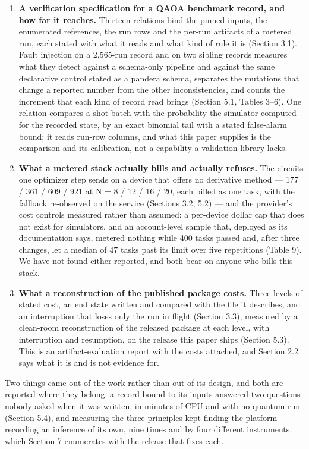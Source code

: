 \documentclass[acmsmall,screen,review]{acmart}
\begin{document}
\begin{enumerate}
\item \textbf{A verification specification for a QAOA benchmark record, and how far it reaches.} Thirteen relations bind the pinned inputs, the enumerated references, the run rows and the per-run artifacts of a metered run, each stated with what it reads and what kind of rule it is (Section 3.1). Fault injection on a 2,565-run record and on two sibling records measures what they detect against a schema-only pipeline and against the same declarative control stated as a pandera schema, separates the mutations that change a reported number from the other inconsistencies, and counts the increment that each kind of record read brings (Section 5.1, Tables 3--6). One relation compares a shot batch with the probability the simulator computed for the recorded state, by an exact binomial tail with a stated false-alarm bound; it reads run-row columns, and what this paper supplies is the comparison and its calibration, not a capability a validation library lacks.
\item \textbf{What a metered stack actually bills and actually refuses.} The circuits one optimizer step sends on a device that offers no derivative method --- 177 / 361 / 609 / 921 at N = 8 / 12 / 16 / 20, each billed as one task, with the fallback re-observed on the service (Sections 3.2, 5.2) --- and the provider's cost controls measured rather than assumed: a per-device dollar cap that does not exist for simulators, and an account-level sample that, deployed as its documentation says, metered nothing while 400 tasks passed and, after three changes, let a median of 47 tasks past its limit over five repetitions (Table 9). We have not found either reported, and both bear on anyone who bills this stack.
\item \textbf{What a reconstruction of the published package costs.} Three levels of stated cost, an end state written and compared with the file it describes, and an interruption that loses only the run in flight (Section 3.3), measured by a clean-room reconstruction of the released package at each level, with interruption and resumption, on the release this paper ships (Section 5.3). This is an artifact-evaluation report with the costs attached, and Section 2.2 says what it is and is not evidence for.
\end{enumerate}
Two things came out of the work rather than out of its design, and both are reported where they belong: a record bound to its inputs answered two questions nobody asked when it was written, in minutes of CPU and with no quantum run (Section 5.4), and measuring the three principles kept finding the platform recording an inference of its own, nine times and by four different instruments, which Section 7 enumerates with the release that fixes each.
\end{document}
